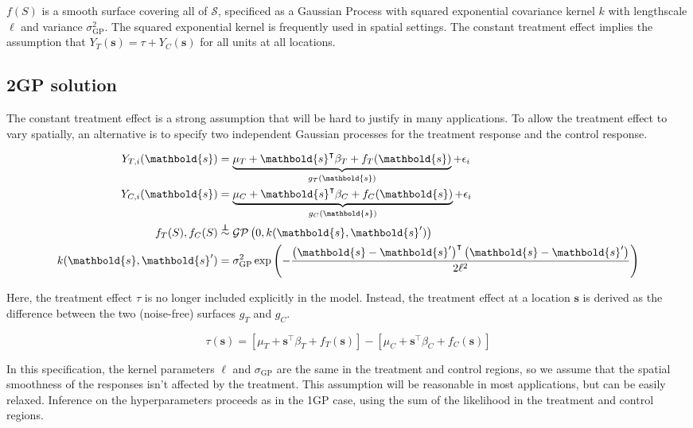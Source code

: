 \documentclass[letter]{article}
\newcommand{\genericdel}[3]{%
      \left#1#3\right#2
    }
\newcommand{\del}[1]{\genericdel(){#1}}
\newcommand{\sbr}[1]{\genericdel[]{#1}}
\newcommand{\gp}{\mathcal{GP}}
\newcommand{\trans}{^{\intercal}}
\newcommand{\scrS}{\mathscr{S}}
\newcommand{\sigmaf}{\sigma_{\mathrm{GP}}}
\newcommand{\svec}{\mathbold{s}}
\newcommand{\indep}{\protect\mathpalette{\protect\independenT}{\perp}}
\def\independenT#1#2{\mathrel{\rlap{$#1#2$}\mkern2mu{#1#2}}}
\begin{document}
\(f(S)\) is a smooth surface covering all of \(\scrS\), specificed as a
Gaussian Process with squared exponential covariance kernel \(k\) with
lengthscale \(\ell\) and variance \(\sigmaf^2\). The squared exponential
kernel is frequently used in spatial settings. The constant treatment
effect implies the assumption that \(Y_T(\svec) = \tau + Y_C(\svec)\)
for all units at all locations.
    


    	\subsection{2GP solution}\label{gp-solution}
    

\label{sec:twogp}
    	The constant treatment effect is a strong assumption that will be hard
to justify in many applications. To allow the treatment effect to vary
spatially, an alternative is to specify two independent Gaussian
processes for the treatment response and the control response.

\begin{equation}
\label{eq:spec2gp}
\begin{split}
Y_{T,i}(\svec) &= \underbrace{\mu_T + \svec\trans\beta_T + f_T(\svec)}_{g_T(\svec)} + \epsilon_i \\
Y_{C,i}(\svec) &= \underbrace{\mu_C + \svec\trans\beta_C + f_C(\svec)}_{g_C(\svec)} + \epsilon_i \\
f_T(S), f_C(S) &\overset{\indep}{\sim} \gp\del{0, k(\svec, \svec')} \\
k(\svec,\svec') &= \sigmaf^2 \exp\del{ - \frac{\del{\svec-\svec'}\trans\del{\svec-\svec'}}{2 \ell^2}}
\end{split}
\end{equation}

Here, the treatment effect \(\tau\) is no longer included explicitly in
the model. Instead, the treatment effect at a location \(\svec\) is
derived as the difference between the two (noise-free) surfaces \(g_T\)
and \(g_C\).

\begin{equation}
\tau(\svec) = \sbr{\mu_T + \svec\trans\beta_T + f_T(\svec)} - \sbr{\mu_C + \svec\trans\beta_C + f_C(\svec)}
\end{equation}

In this specification, the kernel parameters \(\ell\) and \(\sigmaf\)
are the same in the treatment and control regions, so we assume that the
spatial smoothness of the responses isn't affected by the treatment.
This assumption will be reasonable in most applications, but can be
easily relaxed. Inference on the hyperparameters proceeds as in the 1GP
case, using the sum of the likelihood in the treatment and control
regions.
    
\end{document}
